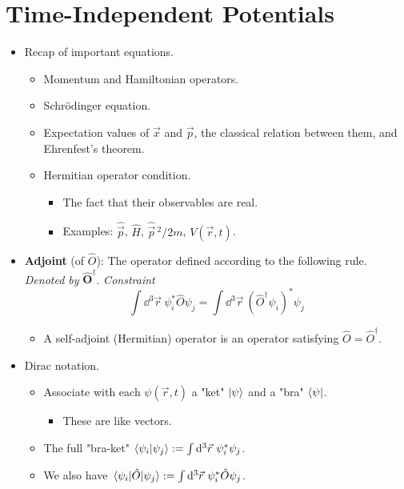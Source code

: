 \documentclass[../notes.tex]{subfiles}
\begin{document}
\section{Time-Independent Potentials}
\begin{itemize}
    \item {}Recap of important equations.
    \begin{itemize}
        \item Momentum and Hamiltonian operators.
        \item Schr\"{o}dinger equation.
        \item Expectation values of $\vec{x}$ and $\vec{p}$, the classical relation between them, and Ehrenfest's theorem.
        \item Hermitian operator condition.
        \begin{itemize}
            \item The fact that their observables are real.
            \item Examples: $\hat{\vec{p}}$, $\hat{H}$, $\hat{\vec{p}}{\,}^2/2m$, $V(\vec{r},t)$.
        \end{itemize}
    \end{itemize}
    \item \textbf{Adjoint} (of $\hat{O}$): The operator defined according to the following rule. \emph{Denoted by} $\bm{\hat{O}^\dagger}$. \emph{Constraint}
    \begin{equation*}
        \int\dd^3\vec{r}\ \psi_i^*\hat{O}\psi_j = \int\dd^3\vec{r}\ (\hat{O}^\dagger\psi_i)^*\psi_j
    \end{equation*}
    \begin{itemize}
        \item A self-adjoint (Hermitian) operator is an operator satisfying $\hat{O}=\hat{O}^\dagger$.
    \end{itemize}
    \item Dirac notation.
    \begin{itemize}
        \item Associate with each $\psi(\vec{r},t)$ a "ket" $\ket{\psi}$ and a "bra" $\bra{\psi}$.
        \begin{itemize}
            \item These are like vectors.
        \end{itemize}
        \item The full "bra-ket" $\braket{\psi_i}{\psi_j}:=\int\dd^3\vec{r}\ \psi_i^*\psi_j$.
        \item We also have $\mel{\psi_i}{\hat{O}}{\psi_j}:=\int\dd^3\vec{r}\ \psi_i^*\hat{O}\psi_j$.

\end{itemize}
\end{itemize}
\end{document}
